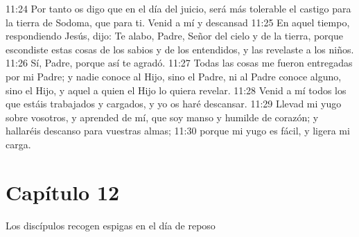 11:24 Por tanto os digo que en el día del juicio, será más tolerable el castigo para la tierra de Sodoma, que para ti. 
Venid a mí y descansad  
11:25 En aquel tiempo, respondiendo Jesús, dijo: Te alabo, Padre, Señor del cielo y de la tierra, porque escondiste estas cosas de los sabios y de los entendidos, y las revelaste a los niños. 
11:26 Sí, Padre, porque así te agradó. 
11:27 Todas las cosas me fueron entregadas por mi Padre; y nadie conoce al Hijo, sino el Padre, ni al Padre conoce alguno, sino el Hijo, y aquel a quien el Hijo lo quiera revelar. 
11:28 Venid a mí todos los que estáis trabajados y cargados, y yo os haré descansar. 
11:29 Llevad mi yugo sobre vosotros, y aprended de mí, que soy manso y humilde de corazón; y hallaréis descanso para vuestras almas; 
11:30 porque mi yugo es fácil, y ligera mi carga.
\section*{Capítulo 12}
Los discípulos recogen espigas en el día de reposo  

